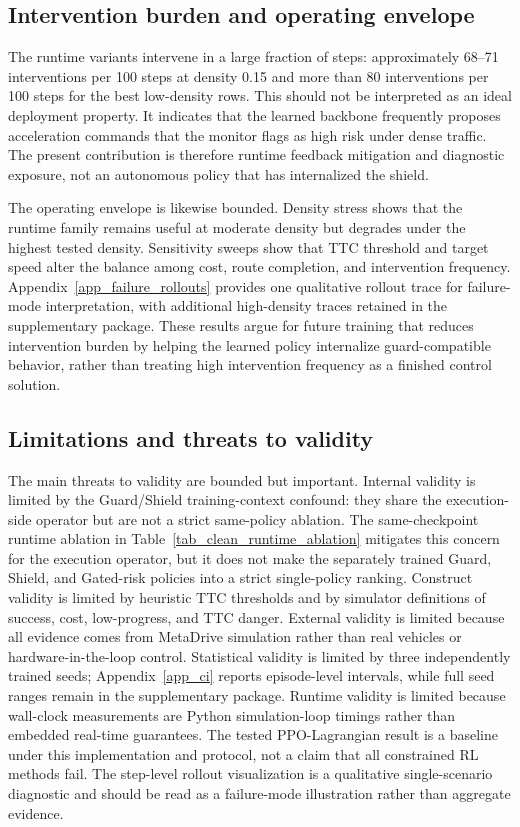 \documentclass[pdflatex,sn-mathphys-ay]{sn-jnl}
\begin{document}
\subsection{Intervention burden and operating envelope}\label{sec_intervention_burden}
The runtime variants intervene in a large fraction of steps: approximately 68--71 interventions per 100 steps at density 0.15 and more than 80 interventions per 100 steps for the best low-density rows. This should not be interpreted as an ideal deployment property. It indicates that the learned backbone frequently proposes acceleration commands that the monitor flags as high risk under dense traffic. The present contribution is therefore runtime feedback mitigation and diagnostic exposure, not an autonomous policy that has internalized the shield.

The operating envelope is likewise bounded. Density stress shows that the runtime family remains useful at moderate density but degrades under the highest tested density. Sensitivity sweeps show that TTC threshold and target speed alter the balance among cost, route completion, and intervention frequency. Appendix~\ref{app_failure_rollouts} provides one qualitative rollout trace for failure-mode interpretation, with additional high-density traces retained in the supplementary package. These results argue for future training that reduces intervention burden by helping the learned policy internalize guard-compatible behavior, rather than treating high intervention frequency as a finished control solution.

\subsection{Limitations and threats to validity}\label{sec_limitations}
The main threats to validity are bounded but important. Internal validity is limited by the Guard/Shield training-context confound: they share the execution-side operator but are not a strict same-policy ablation. The same-checkpoint runtime ablation in Table~\ref{tab_clean_runtime_ablation} mitigates this concern for the execution operator, but it does not make the separately trained Guard, Shield, and Gated-risk policies into a strict single-policy ranking. Construct validity is limited by heuristic TTC thresholds and by simulator definitions of success, cost, low-progress, and TTC danger. External validity is limited because all evidence comes from MetaDrive simulation rather than real vehicles or hardware-in-the-loop control. Statistical validity is limited by three independently trained seeds; Appendix~\ref{app_ci} reports episode-level intervals, while full seed ranges remain in the supplementary package. Runtime validity is limited because wall-clock measurements are Python simulation-loop timings rather than embedded real-time guarantees. The tested PPO-Lagrangian result is a baseline under this implementation and protocol, not a claim that all constrained RL methods fail. The step-level rollout visualization is a qualitative single-scenario diagnostic and should be read as a failure-mode illustration rather than aggregate evidence.
\end{document}
